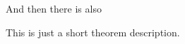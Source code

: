 \documentclass{article}
\newcounter{theorem}
\begin{document}
\lipsum[1]

\begin{theorem}
\lipsum[2]
\end{theorem}

And then there is also

\begin{theorem}
This is just a short theorem description.
\end{theorem}

\lipsum[3]
\end{document}
